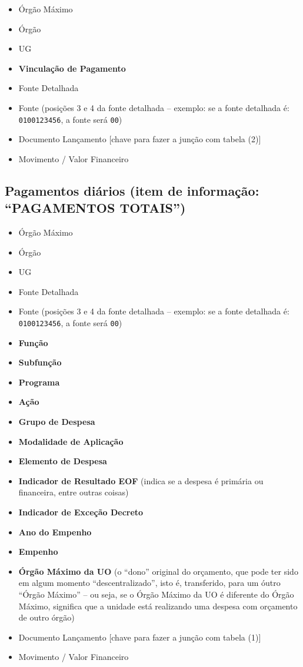 \documentclass[]{book}
\providecommand{\tightlist}{%
  \setlength{\itemsep}{0pt}\setlength{\parskip}{0pt}}
\begin{document}
\begin{itemize}
\tightlist
\item
  Órgão Máximo
\item
  Órgão
\item
  UG
\item
  \textbf{Vinculação de Pagamento}
\item
  Fonte Detalhada
\item
  Fonte (posições 3 e 4 da fonte detalhada -- exemplo: se a fonte detalhada é: \texttt{0100123456}, a fonte será \texttt{00})
\item
  Documento Lançamento {[}chave para fazer a junção com tabela (2){]}
\item
  Movimento / Valor Financeiro
\end{itemize}

\hypertarget{pagamentos-diuxe1rios-item-de-informauxe7uxe3o-pagamentos-totais}{%
\subsection{Pagamentos diários (item de informação: ``PAGAMENTOS TOTAIS'')}\label{pagamentos-diuxe1rios-item-de-informauxe7uxe3o-pagamentos-totais}}

\begin{itemize}
\tightlist
\item
  Órgão Máximo
\item
  Órgão
\item
  UG
\item
  Fonte Detalhada
\item
  Fonte (posições 3 e 4 da fonte detalhada -- exemplo: se a fonte detalhada é: \texttt{0100123456}, a fonte será \texttt{00})
\item
  \textbf{Função}
\item
  \textbf{Subfunção}
\item
  \textbf{Programa}
\item
  \textbf{Ação}
\item
  \textbf{Grupo de Despesa}
\item
  \textbf{Modalidade de Aplicação}
\item
  \textbf{Elemento de Despesa}
\item
  \textbf{Indicador de Resultado EOF} (indica se a despesa é primária ou financeira, entre outras coisas)
\item
  \textbf{Indicador de Exceção Decreto}
\item
  \textbf{Ano do Empenho}
\item
  \textbf{Empenho}
\item
  \textbf{Órgão Máximo da UO} (o ``dono'' original do orçamento, que pode ter sido em algum momento ``descentralizado'', isto é, transferido, para um óutro ``Órgão Máximo'' -- ou seja, se o Órgão Máximo da UO é diferente do Órgão Máximo, significa que a unidade está realizando uma despesa com orçamento de outro órgão)
\item
  Documento Lançamento {[}chave para fazer a junção com tabela (1){]}
\item
  Movimento / Valor Financeiro
\end{itemize}
\end{document}
